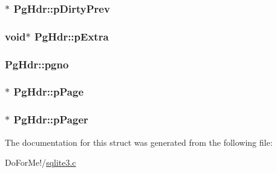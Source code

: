 \hypertarget{struct_pg_hdr_a8392b45bb05d88c734020beb912304dc}{
\subsubsection[{p\-Dirty\-Prev}]{$\ast$ Pg\-Hdr\-::p\-Dirty\-Prev}}\label{struct_pg_hdr_a8392b45bb05d88c734020beb912304dc}
\hypertarget{struct_pg_hdr_a8ff7430ed04077f1ae20d10801968164}{
\subsubsection[{p\-Extra}]{\setlength{\rightskip}{0pt plus 5cm}void$\ast$ Pg\-Hdr\-::p\-Extra}}\label{struct_pg_hdr_a8ff7430ed04077f1ae20d10801968164}
\hypertarget{struct_pg_hdr_ab6e2223e410acf9bae7f12f1b1293589}{
\subsubsection[{pgno}]{ Pg\-Hdr\-::pgno}}\label{struct_pg_hdr_ab6e2223e410acf9bae7f12f1b1293589}
\hypertarget{struct_pg_hdr_aa5645976ba0634993a7304dce8856c8b}{
\subsubsection[{p\-Page}]{$\ast$ Pg\-Hdr\-::p\-Page}}\label{struct_pg_hdr_aa5645976ba0634993a7304dce8856c8b}
\hypertarget{struct_pg_hdr_aaa4879a9510c8a819a1e10a8ee21495b}{
\subsubsection[{p\-Pager}]{$\ast$ Pg\-Hdr\-::p\-Pager}}\label{struct_pg_hdr_aaa4879a9510c8a819a1e10a8ee21495b}


The documentation for this struct was generated from the following file\-:\begin{DoxyCompactItemize}
\item 
Do\-For\-Me!/\hyperlink{sqlite3_8c}{sqlite3.\-c}\end{DoxyCompactItemize}
